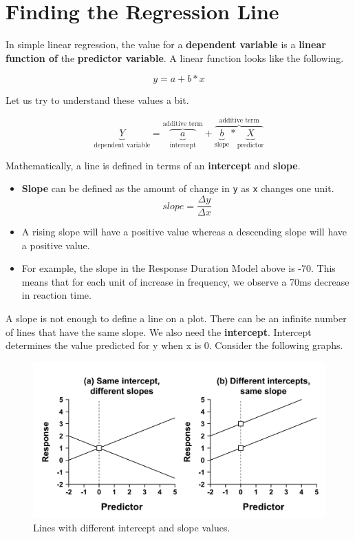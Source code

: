\documentclass[
]{book}
\providecommand{\tightlist}{%
  \setlength{\itemsep}{0pt}\setlength{\parskip}{0pt}}
\begin{document}
\hypertarget{finding-the-regression-line}{%
\section{Finding the Regression Line}\label{finding-the-regression-line}}

In simple linear regression, the value for a \textbf{dependent variable} is a \textbf{linear function of} the \textbf{predictor variable}. A linear function looks like the following.

\[y = a + b * x\]

Let us try to understand these values a bit.

\[ \underbrace{Y}_{\text{dependent variable}} =
            \overbrace{\underbrace{a}_{\text{intercept}}}^{\text{additive term}} + 
            \overbrace{\underbrace{b}_{\text{slope}} * \underbrace{X}_{\text{predictor}}}^{\text{additive term}} \]

Mathematically, a line is defined in terms of an \textbf{intercept} and \textbf{slope}.

\begin{itemize}
\tightlist
\item
  \textbf{Slope} can be defined as the amount of change in \texttt{y} as \texttt{x} changes one unit.
  \[ slope = \frac{\Delta y}{\Delta x}  \]
\item
  A rising slope will have a positive value whereas a descending slope will have a positive value.
\item
  For example, the slope in the Response Duration Model above is -70. This means that for each unit of increase in frequency, we observe a 70ms decrease in reaction time.
\end{itemize}

A slope is not enough to define a line on a plot. There can be an infinite number of lines that have the same slope. We also need the \textbf{intercept}. Intercept determines the value predicted for y when x is 0. Consider the following graphs.

\begin{figure}
\centering
\includegraphics{./img/lr/lr2.png}
\caption{\label{fig:interceptslope}Lines with different intercept and slope values.}
\end{figure}
\end{document}
